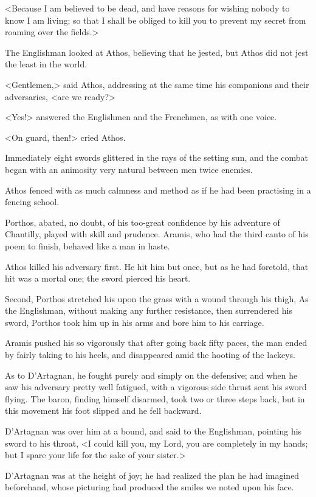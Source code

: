 <Because I am believed to be dead, and have reasons for wishing nobody to know I am living; so that I shall be obliged to kill you to prevent my secret from roaming over the fields.> 

The Englishman looked at Athos, believing that he jested, but Athos did not jest the least in the world. 

<Gentlemen,> said Athos, addressing at the same time his companions and their adversaries, <are we ready?> 

<Yes!> answered the Englishmen and the Frenchmen, as with one voice. 

<On guard, then!> cried Athos. 

Immediately eight swords glittered in the rays of the setting sun, and the combat began with an animosity very natural between men twice enemies. 

Athos fenced with as much calmness and method as if he had been practising in a fencing school. 

Porthos, abated, no doubt, of his too-great confidence by his adventure of Chantilly, played with skill and prudence. Aramis, who had the third canto of his poem to finish, behaved like a man in haste. 

Athos killed his adversary first. He hit him but once, but as he had foretold, that hit was a mortal one; the sword pierced his heart. 

Second, Porthos stretched his upon the grass with a wound through his thigh, As the Englishman, without making any further resistance, then surrendered his sword, Porthos took him up in his arms and bore him to his carriage. 

Aramis pushed his so vigorously that after going back fifty paces, the man ended by fairly taking to his heels, and disappeared amid the hooting of the lackeys. 

As to D'Artagnan, he fought purely and simply on the defensive; and when he saw his adversary pretty well fatigued, with a vigorous side thrust sent his sword flying. The baron, finding himself disarmed, took two or three steps back, but in this movement his foot slipped and he fell backward. 

D'Artagnan was over him at a bound, and said to the Englishman, pointing his sword to his throat, <I could kill you, my Lord, you are completely in my hands; but I spare your life for the sake of your sister.> 

D'Artagnan was at the height of joy; he had realized the plan he had imagined beforehand, whose picturing had produced the smiles we noted upon his face. 

